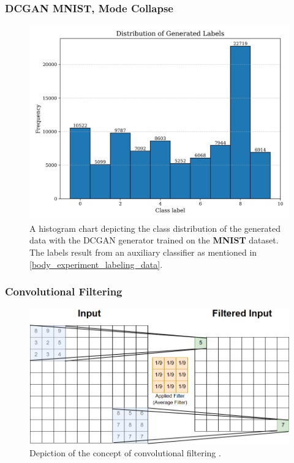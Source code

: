 \subsubsection{DCGAN MNIST, Mode Collapse}
\begin{figure}[htbp]
    \centering
    \includegraphics[width=.9\textwidth]{abb/datageneration_histograms/dc_mnist.png}
    \caption{A histogram chart depicting the class distribution of the generated data with the DCGAN generator trained on the \textbf{MNIST} dataset. The labels result from an auxiliary classifier as mentioned in \ref{body_experiment_labeling_data}.}
    \label{fig:figure_dcgan_datacreation_histogram}
\end{figure}

\subsubsection{Convolutional Filtering}
\begin{figure}[htbp]
    \centering
    \includegraphics[width=.9\textwidth]{abb/maucher/maucher_ConvolutionConcept.png}
    \caption{Depiction of the concept of convolutional filtering \cite{Maucher2025}.}
    \label{fig:maucher_convolutional_filtering}
\end{figure}
